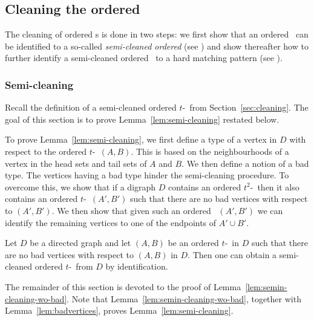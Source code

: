 \subsection{Cleaning the ordered \toughpair}
\label{sec:cleaningordered}

The cleaning of ordered \toughpair s is done in two steps:
we first show that an ordered \toughpair\ can be identified to a so-called \emph{semi-cleaned ordered \toughpair} (see ) and show thereafter how to further identify a semi-cleaned ordered \toughpair\ to a hard matching pattern (see ).

\subsubsection{Semi-cleaning}
\label{sec:semicleaning}

Recall the definition of a semi-cleaned ordered $t$-\toughpair\ from Section~\ref{sec:cleaning}.
The goal of this section is to prove Lemma~\ref{lem:semi-cleaning} restated below.

\semicleaning*

To prove Lemma~\ref{lem:semi-cleaning}, we first define a type of a vertex in $D$ with respect to the ordered $t$-\toughpair\ $(A,B)$. This is based on the neighbourhoods of a vertex in the head sets and tail sets of $A$ and $B$. We then define a notion of a bad type. The vertices having a bad type hinder the semi-cleaning procedure. To overcome this,
we show that if a digraph $D$ contains an ordered $t^2$-\toughpair\ then it also contains an ordered $t$-\toughpair\ $(A',B')$ such that there are no bad vertices with respect to $(A',B')$. We then show that given such an ordered \toughpair\ $(A',B')$ we can identify the remaining vertices to one of the endpoints of $A' \cup B'$.



\begin{lemma}\label{lem:semin-cleaning-wo-bad}
Let $D$ be a directed 
graph and let $(A,B)$ be an ordered $t$-\toughpair\ in $D$ such that there are no bad vertices with respect to $(A,B)$ in $D$. Then one can obtain a semi-cleaned ordered $t$-\toughpair\ from $D$ by identification.
\end{lemma}

The remainder of this section is devoted to the proof of Lemma~\ref{lem:semin-cleaning-wo-bad}. Note that Lemma~\ref{lem:semin-cleaning-wo-bad}, together with Lemma~\ref{lem:badvertices}, proves Lemma~\ref{lem:semi-cleaning}.

